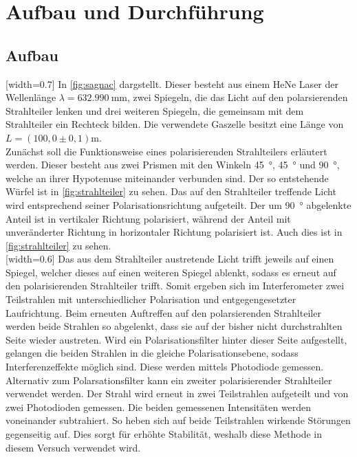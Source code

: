 \section {Aufbau und Durchführung}
\label{sec:durchführung}

\subsection{Aufbau}
[width=0.7\textwidth]
In \autoref{fig:sagnac} dargstellt. Dieser besteht aus einem HeNe Laser der Wellenlänge $\lambda = \SI{632.990}{\milli\meter}$, zwei Spiegeln, die das Licht auf den polarsierenden Strahlteiler lenken und drei weiteren Spiegeln, die gemeinsam mit dem Strahlteiler ein Rechteck bilden. Die verwendete Gaszelle besitzt eine Länge von $L=(100,0 \pm 0,1)\si{\meter}$.\\
Zunächst soll die Funktionsweise eines polarisierenden Strahlteilers erläutert werden. Dieser besteht aus zwei Prismen mit den Winkeln \SI{45}{\degree}, \SI{45}{\degree} und \SI{90}{\degree}, welche an ihrer Hypotenuse miteinander verbunden sind. Der so entstehende Würfel ist in \autoref{fig:strahlteiler} zu sehen. Das auf den Strahlteiler treffende Licht wird entsprechend seiner Polarisationsrichtung aufgeteilt. Der um \SI{90}{\degree} abgelenkte Anteil ist in vertikaler Richtung polarisiert, während der Anteil mit unveränderter Richtung in horizontaler Richtung polarisiert ist. Auch dies ist in \autoref{fig:strahlteiler} zu sehen. \\
[width=0.6\textwidth]
Das aus dem Strahlteiler austretende Licht trifft jeweils auf einen Spiegel, welcher dieses auf einen weiteren Spiegel ablenkt, sodass es erneut auf den polarisierenden Strahlteiler trifft. Somit ergeben sich im Interferometer zwei Teilstrahlen mit unterschiedlicher Polarisation und entgegengesetzter Laufrichtung. Beim erneuten Auftreffen auf den polarsierenden Strahlteiler werden beide Strahlen so abgelenkt, dass sie auf der bisher nicht durchstrahlten Seite wieder austreten. Wird ein Polarisationsfilter hinter dieser Seite aufgestellt, gelangen die beiden Strahlen in die gleiche Polarisationsebene, sodass Interferenzeffekte möglich sind. Diese werden mittels Photodiode gemessen. Alternativ zum Polarsationsfilter kann ein zweiter polarisierender Strahlteiler verwendet werden. Der Strahl wird erneut in zwei Teilstrahlen aufgeteilt und von zwei Photodioden gemessen. Die beiden gemessenen Intensitäten werden voneinander subtrahiert. So heben sich auf beide Teilstrahlen wirkende Störungen gegenseitig auf. Dies sorgt für erhöhte Stabilität, weshalb diese Methode in diesem Versuch verwendet wird.

